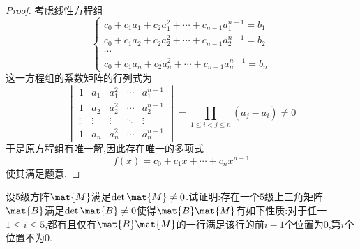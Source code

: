 \documentclass{ctexart}
\begin{document}
\begin{proof}
    考虑线性方程组
    \[\left\{\begin{array}{c}
        c_0+c_1a_1+c_2a_1^2+\cdots+c_{n-1}a_1^{n-1}=b_1\\
        c_0+c_1a_2+c_2a_2^2+\cdots+c_{n-1} a_2^{n-1}=b_2\\
        \cdots\\
        c_0+c_1a_n+c_2a_n^2+\cdots+c_{n-1} a_n^{n-1}=b_n
    \end{array}\right.\]
    这一方程组的系数矩阵的行列式为
    \[\begin{vmatrix}
        1&a_1&a_1^2&\cdots&a_1^{n-1}\\
        1&a_2&a_2^2&\cdots&a_2^{n-1}\\
        \vdots&\vdots&\vdots&\ddots&\vdots\\
        1&a_n&a_n^2&\cdots&a_n^{n-1}
    \end{vmatrix}=\prod_{1\leqslant i<j\leqslant n}\left(a_j-a_i\right)\neq0\]
    于是原方程组有唯一解,因此存在唯一的多项式
    \[f(x)=c_0+c_1x+\cdots+c_nx^{n-1}\]
    使其满足题意.
\end{proof}
\begin{homework}[8(10')]
    设$5$级方阵$\mat{M}$满足$\det\mat{M}\neq0$.试证明:存在一个$5$级上三角矩阵$\mat{B}$满足$\det\mat{B}\neq0$使得$\mat{B}\mat{M}$有如下性质:对于任一$1\leqslant i\leqslant 5$,都有且仅有$\mat{B}\mat{M}$的一行满足该行的前$i-1$个位置为$0$,第$i$个位置不为$0$.
\end{homework}
\end{document}
